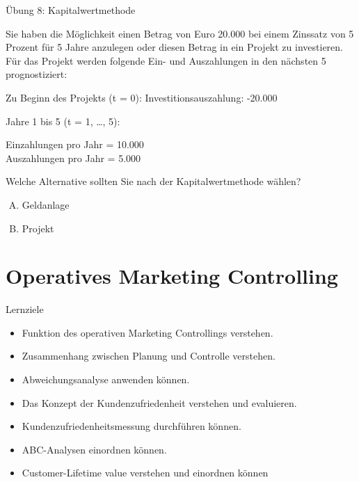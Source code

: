 \documentclass[12pt,ngerman,a4paper,ignorenonframetext,]{beamer}
\providecommand{\tightlist}{%
  \setlength{\itemsep}{0pt}\setlength{\parskip}{0pt}}
\begin{document}
\begin{frame}{Übung 8: Kapitalwertmethode}
\protect\hypertarget{ubung-8-kapitalwertmethode}{}

Sie haben die Möglichkeit einen Betrag von Euro 20.000 bei einem
Zinssatz von 5 Prozent für 5 Jahre anzulegen oder diesen Betrag in ein
Projekt zu investieren. Für das Projekt werden folgende Ein- und
Auszahlungen in den nächsten 5 prognostiziert:

Zu Beginn des Projekts (t = 0): Investitionsauszahlung: -20.000

Jahre 1 bis 5 (t = 1, \ldots{}, 5):

Einzahlungen pro Jahr = 10.000\\
Auszahlungen pro Jahr = 5.000

Welche Alternative sollten Sie nach der Kapitalwertmethode wählen?

\begin{enumerate}
[A.]
\tightlist
\item
  Geldanlage
\item
  Projekt
\end{enumerate}


\end{frame}

\hypertarget{operatives-marketing-controlling}{%
\section{Operatives Marketing
Controlling}\label{operatives-marketing-controlling}}

\begin{frame}{Lernziele}
\protect\hypertarget{lernziele-2}{}

\begin{itemize}
\tightlist
\item
  Funktion des operativen Marketing Controllings verstehen.
\item
  Zusammenhang zwischen Planung und Controlle verstehen.
\item
  Abweichungsanalyse anwenden können.
\item
  Das Konzept der Kundenzufriedenheit verstehen und evaluieren.
\item
  Kundenzufriedenheitsmessung durchführen können.
\item
  ABC-Analysen einordnen können.
\item
  Customer-Lifetime value verstehen und einordnen können
\end{itemize}

\end{frame}
\end{document}
